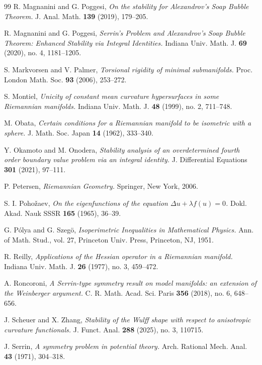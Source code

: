 \documentclass[reqno,11pt]{amsart}
\numberwithin{equation}{section}  %
\begin{document}
\begin{thebibliography}{99}
R. Magnanini and G. Poggesi,
\emph{On the stability for Alexandrov’s Soap Bubble Theorem.}
J. Anal. Math. {\bf 139} (2019), 179--205.

R. Magnanini and G. Poggesi,
\emph{Serrin's Problem and Alexandrov's Soap Bubble Theorem: Enhanced Stability via Integral Identities.}
Indiana Univ. Math. J. {\bf 69} (2020), no. 4, 1181--1205.

S. Markvorsen and V. Palmer,
\emph{Torsional rigidity of minimal submanifolds.}
Proc. London Math. Soc. {\bf 93} (2006), 253--272.

S. Montiel,
\emph{Unicity of constant mean curvature hypersurfaces in some Riemannian manifolds.}
Indiana Univ. Math. J. {\bf 48} (1999), no. 2, 711--748.

M. Obata,
\emph{Certain conditions for a Riemannian manifold to be isometric with a sphere.}
J. Math. Soc. Japan {\bf 14} (1962), 333--340.

Y. Okamoto and M. Onodera,
\emph{Stability analysis of an overdetermined fourth order boundary value problem via an integral identity.}
J. Differential Equations {\bf 301} (2021), 97--111.

P. Petersen,
\emph{Riemannian Geometry.}
Springer, New York, 2006.

S. I. Poho\v{z}aev,
\emph{On the eigenfunctions of the equation $\Delta u + \lambda f(u)=0$.}
Dokl. Akad. Nauk SSSR {\bf 165} (1965), 36--39.

G. P\'olya and G. Szeg\"o,
\emph{Isoperimetric Inequalities in Mathematical Physics.}
Ann. of Math. Stud., vol. 27, Princeton Univ. Press, Princeton, NJ, 1951.

R. Reilly,
\emph{Applications of the Hessian operator in a Riemannian manifold.}
Indiana Univ. Math. J. {\bf 26} (1977), no. 3, 459--472.

A. Roncoroni,
\emph{A Serrin-type symmetry result on model manifolds: an extension of the Weinberger argument.}
C. R. Math. Acad. Sci. Paris {\bf 356} (2018), no. 6, 648--656.

J. Scheuer and X. Zhang,
\emph{Stability of the Wulff shape with respect to anisotropic curvature functionals.}
J. Funct. Anal. {\bf 288} (2025), no. 3, 110715.

J. Serrin,
\emph{A symmetry problem in potential theory.}
Arch. Rational Mech. Anal. {\bf 43} (1971), 304--318.


\end{thebibliography}
\end{document}
